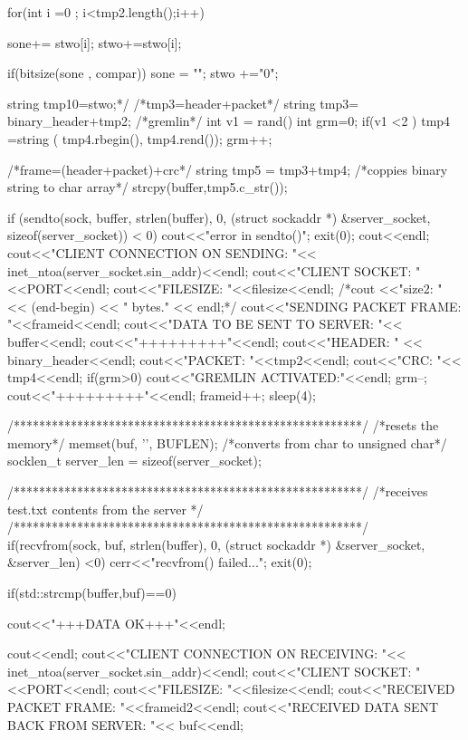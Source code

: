 \documentclass{article}
\begin{document}
\begin{titlepage}
{{{  			for(int i =0 ; i<tmp2.length();i++)
  			{
  				sone+= stwo[i];
  				stwo+=stwo[i];
  			
  			
  				if(bitsize(sone , compar))
  				{
  					sone = "";
  					stwo +="0";
  				}
  			}
  			string tmp10=stwo;*/
  			/*tmp3=header+packet*/
  			string tmp3= binary_header+tmp2;
  			/*gremlin*/
  			int v1 = rand() %
  			int grm=0;
  			if(v1 <2 )
  			{
  				tmp4 =string ( tmp4.rbegin(), tmp4.rend());
  			grm++;
  			} 
  			
  			
  			/*frame=(header+packet)+crc*/
  			string tmp5 = tmp3+tmp4;
  			/*coppies binary string to char array*/
			strcpy(buffer,tmp5.c_str());
			
			if (sendto(sock, buffer, strlen(buffer), 0, (struct sockaddr *) &server_socket, sizeof(server_socket)) < 0)
			{
				cout<<"error in sendto()";
				exit(0);
			}	
			cout<<endl;
			cout<<"CLIENT CONNECTION ON SENDING: "<< inet_ntoa(server_socket.sin_addr)<<endl;
			cout<<"CLIENT SOCKET: "<<PORT<<endl;
			cout<<"FILESIZE: "<<filesize<<endl;
			/*cout <<"size2: " << (end-begin) << " bytes." << endl;*/		
			cout<<"SENDING PACKET FRAME: "<<frameid<<endl;
			cout<<"DATA TO BE SENT TO SERVER: "<< buffer<<endl;
			cout<<"+++++++++"<<endl;
			cout<<"HEADER: " << binary_header<<endl;
			cout<<"PACKET: "<<tmp2<<endl;
			cout<<"CRC: "<< tmp4<<endl;
			if(grm>0)
			{
				cout<<"GREMLIN ACTIVATED:"<<endl;
			}
			grm--;
			cout<<"+++++++++"<<endl;
			frameid++;
			sleep(4);
			
			
	/*******************************************************/
		/*resets the memory*/
			memset(buf, '\0', BUFLEN);
		/*converts from char to unsigned char*/
			socklen_t server_len = sizeof(server_socket);
			
	/*******************************************************/
		/*receives test.txt contents from the server */
	/*******************************************************/
			if(recvfrom(sock, buf, strlen(buffer), 0, (struct sockaddr *) &server_socket,  &server_len) <0)
			{
				cerr<<"recvfrom() failed...";
				exit(0);
			}
			
		
			if(std::strcmp(buffer,buf)==0)
			{
				cout<<"+++DATA OK+++"<<endl;
				
				cout<<endl;
				cout<<"CLIENT CONNECTION ON RECEIVING: "<< inet_ntoa(server_socket.sin_addr)<<endl;
				cout<<"CLIENT SOCKET: "<<PORT<<endl;
				cout<<"FILESIZE: "<<filesize<<endl;
				cout<<"RECEIVED PACKET FRAME: "<<frameid2<<endl;
				cout<<"RECEIVED DATA SENT BACK FROM SERVER: "<< buf<<endl;
		
}}}}
\end{titlepage}
\end{document}
